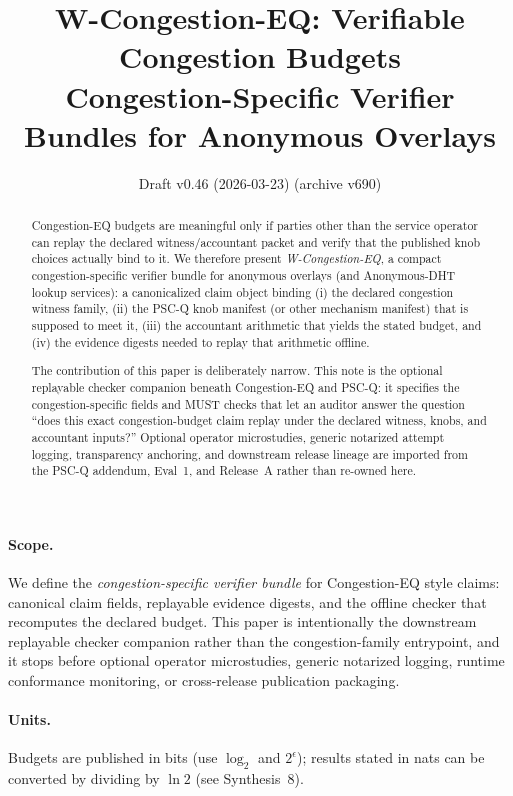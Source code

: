 \documentclass[11pt]{article}
\title{W-Congestion-EQ: Verifiable Congestion Budgets\\
Congestion-Specific Verifier Bundles for Anonymous Overlays}
\author{}
\date{Draft v0.46 (2026-03-23) (archive v690)}
\begin{document}
\maketitle

\begin{abstract}
Congestion-EQ budgets are meaningful only if parties other than the service operator can replay the declared witness/accountant packet and verify that the published knob choices actually bind to it.
We therefore present \emph{W-Congestion-EQ}, a compact congestion-specific verifier bundle for anonymous overlays (and Anonymous-DHT lookup services): a canonicalized claim object binding (i) the declared congestion witness family, (ii) the PSC-Q knob manifest (or other mechanism manifest) that is supposed to meet it, (iii) the accountant arithmetic that yields the stated budget, and (iv) the evidence digests needed to replay that arithmetic offline.

The contribution of this paper is deliberately narrow.
This note is the optional replayable checker companion beneath Congestion-EQ and PSC-Q: it specifies the congestion-specific fields and MUST checks that let an auditor answer the question ``does this exact congestion-budget claim replay under the declared witness, knobs, and accountant inputs?''
Optional operator microstudies, generic notarized attempt logging, transparency anchoring, and downstream release lineage are imported from the PSC-Q addendum, Eval~1, and Release~A rather than re-owned here.
\end{abstract}

\paragraph{Scope.}
We define the \emph{congestion-specific verifier bundle} for Congestion-EQ style claims: canonical claim fields, replayable evidence digests, and the offline checker that recomputes the declared budget.
This paper is intentionally the downstream replayable checker companion rather than the congestion-family entrypoint, and it stops before optional operator microstudies, generic notarized logging, runtime conformance monitoring, or cross-release publication packaging.\cite{series:pscqaddendum,series:evalnotary,series:release,series:abom}

\paragraph{Units.} Budgets are published in bits (use $\log_2$ and $2^{\epsilon}$); results stated in nats can be converted by dividing by $\ln 2$ (see Synthesis~8).\cite{series:notation}
\end{document}

